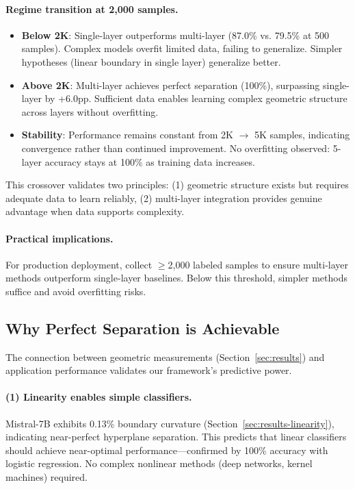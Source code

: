 \documentclass[11pt]{article}
\begin{document}
\paragraph{Regime transition at 2,000 samples.}
\begin{itemize}
\item \textbf{Below 2K}: Single-layer outperforms multi-layer (87.0\% vs. 79.5\% at 500 samples). Complex models overfit limited data, failing to generalize. Simpler hypotheses (linear boundary in single layer) generalize better.
\item \textbf{Above 2K}: Multi-layer achieves perfect separation (100\%), surpassing single-layer by +6.0pp. Sufficient data enables learning complex geometric structure across layers without overfitting.
\item \textbf{Stability}: Performance remains constant from 2K $\to$ 5K samples, indicating convergence rather than continued improvement. No overfitting observed: 5-layer accuracy stays at 100\% as training data increases.
\end{itemize}

This crossover validates two principles: (1) geometric structure exists but requires adequate data to learn reliably, (2) multi-layer integration provides genuine advantage when data supports complexity.

\paragraph{Practical implications.} For production deployment, collect $\geq$2,000 labeled samples to ensure multi-layer methods outperform single-layer baselines. Below this threshold, simpler methods suffice and avoid overfitting risks.

\subsection{Why Perfect Separation is Achievable}

The connection between geometric measurements (Section~\ref{sec:results}) and application performance validates
our framework's predictive power.

\paragraph{(1) Linearity enables simple classifiers.} Mistral-7B exhibits 0.13\% boundary curvature (Section~\ref{sec:results-linearity}), indicating near-perfect hyperplane separation. This predicts that linear classifiers should
achieve near-optimal performance—confirmed by 100\% accuracy with logistic regression. No complex nonlinear methods (deep networks, kernel machines) required.
\end{document}
